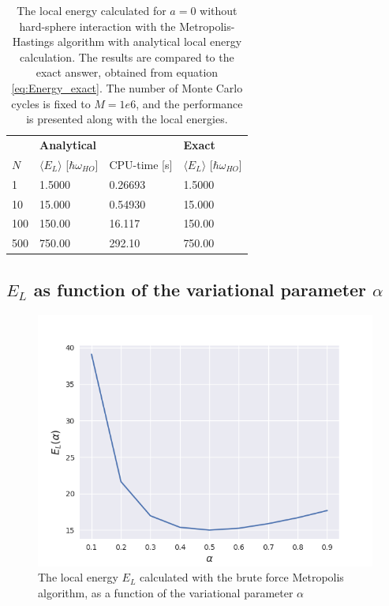 \documentclass[norsk,a4paper,12pt]{article}
\begin{document}
\begin{table} [H]
	\centering
	\caption{The local energy calculated for $a=0$  without hard-sphere interaction with the Metropolis-Hastings algorithm with analytical local energy calculation. The results are compared to the exact answer, obtained from equation \ref{eq:Energy_exact}. The number of Monte Carlo cycles is fixed to $M=1e6$, and the performance is presented along with the local energies.}
	\begin{tabularx}{\textwidth}{X|XX|X} \hline
		\label{tab:ISmet}
		& \textbf{Analytical}  & & \textbf{Exact}\\
		$N$ & $\langle E_L\rangle$ [$\hbar\omega_{HO}$] & CPU-time [s] & $\langle E_L\rangle$ [$\hbar\omega_{HO}$]\\ \hline
		1 & 1.5000 & 0.26693  & 1.5000 \\
		10 & 15.000 &  0.54930 & 15.000 \\
		100 & 150.00 & 16.117 & 150.00 \\
		500 & 750.00 & 292.10 & 750.00 \\ \hline
	\end{tabularx}
\end{table}


 \subsection{$E_L$ as function of the variational parameter $\alpha$}

\begin{figure} [H]
	\centering
	\includegraphics[scale=0.65]{images/energy.png}
	\caption{The local energy $E_L$ calculated with the brute force Metropolis algorithm, as a function of the variational parameter $\alpha$}
	\label{fig:EL_as_func_of_alpha}
\end{figure} 
\end{document}
